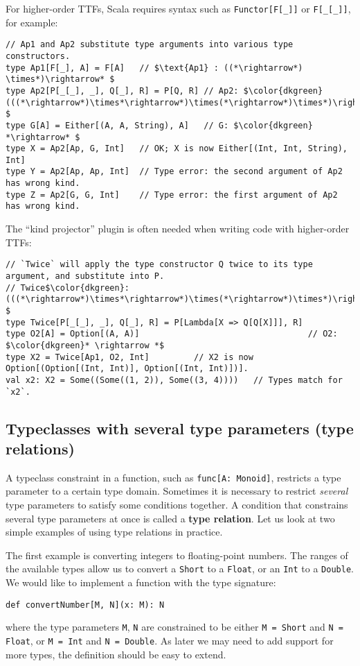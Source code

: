 For higher-order TTFs, Scala requires syntax such as \lstinline!Functor[F[_]]!
or \lstinline!F[_[_]]!, for example:
\begin{lstlisting}[mathescape=true]
// Ap1 and Ap2 substitute type arguments into various type constructors.
type Ap1[F[_], A] = F[A]   // $\text{Ap1} : ((*\rightarrow*) \times*)\rightarrow* $
type Ap2[P[_[_], _], Q[_], R] = P[Q, R] // Ap2: $\color{dkgreen}(((*\rightarrow*)\times*\rightarrow*)\times(*\rightarrow*)\times*)\rightarrow* $
type G[A] = Either[(A, A, String), A]   // G: $\color{dkgreen} *\rightarrow* $
type X = Ap2[Ap, G, Int]   // OK; X is now Either[(Int, Int, String), Int]
type Y = Ap2[Ap, Ap, Int]  // Type error: the second argument of Ap2 has wrong kind.
type Z = Ap2[G, G, Int]    // Type error: the first argument of Ap2 has wrong kind.
\end{lstlisting}
The \textsf{``}kind projector\textsf{''} plugin is often needed when writing code
with higher-order TTFs:
\begin{lstlisting}[mathescape=true]
// `Twice` will apply the type constructor Q twice to its type argument, and substitute into P.
// Twice$\color{dkgreen}:(((*\rightarrow*)\times*\rightarrow*)\times(*\rightarrow*)\times*)\rightarrow* $
type Twice[P[_[_], _], Q[_], R] = P[Lambda[X => Q[Q[X]]], R]
type O2[A] = Option[(A, A)]                                  // O2: $\color{dkgreen}* \rightarrow *$
type X2 = Twice[Ap1, O2, Int]         // X2 is now Option[(Option[(Int, Int)], Option[(Int, Int)])].
val x2: X2 = Some((Some((1, 2)), Some((3, 4))))   // Types match for `x2`.
\end{lstlisting}


\subsection{Typeclasses with several type parameters (type relations)\label{subsec:Typeclasses-type-relations}}

A typeclass constraint in a function, such as \lstinline!func[A: Monoid]!,
restricts a type parameter to a certain type domain. Sometimes it
is necessary to restrict \emph{several} type parameters to satisfy
some conditions together. A condition that constrains several type
parameters at once is called a \textbf{type
relation}. Let us look at two simple examples of using type relations
in practice. 

The first example is converting integers to floating-point numbers.
The ranges of the available types allow us to convert a \lstinline!Short!
to a \lstinline!Float!, or an \lstinline!Int! to a \lstinline!Double!.
We would like to implement a function with the type signature:
\begin{lstlisting}
def convertNumber[M, N](x: M): N
\end{lstlisting}
where the type parameters \lstinline!M!, \lstinline!N! are constrained
to be either \lstinline!M = Short! and \lstinline!N = Float!, or
\lstinline!M = Int! and \lstinline!N = Double!. As later we may
need to add support for more types, the definition should be easy
to extend.

